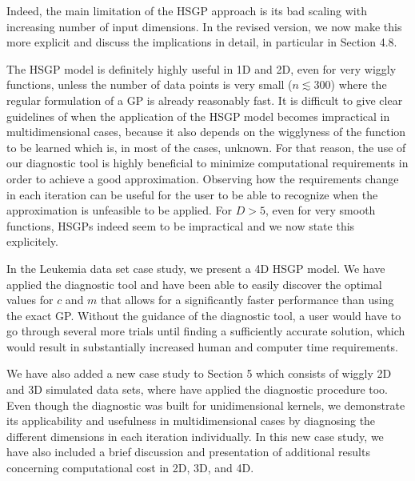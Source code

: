 \documentclass[11pt]{report}
\begin{document}
Indeed, the main limitation of the HSGP approach is its bad scaling with increasing number of input dimensions. In the revised version, we now make this more explicit and discuss the implications in detail, in particular in Section 4.8.

The HSGP model is definitely highly useful in 1D and 2D, even for very wiggly functions, unless the number of data points is very small ($n \lesssim 300$) where the regular formulation of a GP is already reasonably fast. It is difficult to give clear guidelines of when the application of the HSGP model becomes impractical in multidimensional cases, because it also depends on the wigglyness of the function to be learned which is, in most of the cases, unknown. For that reason, the use of our diagnostic tool is highly beneficial to minimize computational requirements in order to achieve a good approximation. Observing how the requirements change in each iteration can be useful for the user to be able to recognize when the approximation is unfeasible to be applied. For $D>5$, even for very smooth functions, HSGPs indeed seem to be impractical and we now state this explicitely.

In the Leukemia data set case study, we present a 4D HSGP model. We have applied the diagnostic tool and have been able to easily discover the optimal values for $c$ and $m$ that allows for a significantly faster performance than using the exact GP. Without the guidance of the diagnostic tool, a user would have to go through several more trials until finding a sufficiently accurate solution, which would result in substantially increased human and computer time requirements.

We have also added a new case study to Section 5 which consists of wiggly 2D and 3D simulated data sets, where have applied the diagnostic procedure too. Even though the diagnostic was built for unidimensional kernels, we demonstrate its applicability and usefulness in multidimensional cases by diagnosing the different dimensions in each iteration individually. 
In this new case study, we have also included a brief discussion and presentation of additional results concerning computational cost in 2D, 3D, and 4D.

\end{document}
